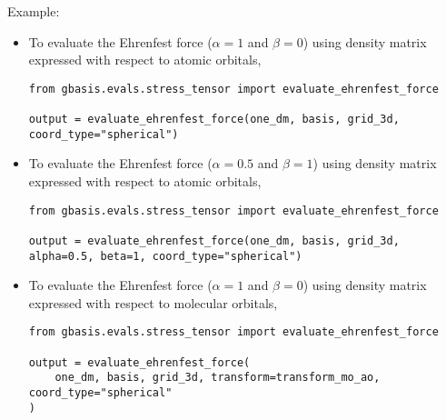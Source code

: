 \documentclass[letterpaper]{article}
\begin{document}
Example:
\begin{itemize}
\item To evaluate the Ehrenfest force ($\alpha=1$ and $\beta=0$)
  using density matrix expressed with respect to atomic orbitals,
  \begin{lstlisting}[xleftmargin=-25pt]
from gbasis.evals.stress_tensor import evaluate_ehrenfest_force

output = evaluate_ehrenfest_force(one_dm, basis, grid_3d, coord_type="spherical")
\end{lstlisting}
\item To evaluate the Ehrenfest force ($\alpha=0.5$ and $\beta=1$)
  using density matrix expressed with respect to atomic orbitals,
  \begin{lstlisting}[xleftmargin=-25pt]
from gbasis.evals.stress_tensor import evaluate_ehrenfest_force

output = evaluate_ehrenfest_force(one_dm, basis, grid_3d, alpha=0.5, beta=1, coord_type="spherical")
\end{lstlisting}
\item To evaluate the Ehrenfest force ($\alpha=1$ and $\beta=0$)
  using density matrix expressed with respect to molecular orbitals,
  \begin{lstlisting}[xleftmargin=-25pt]
from gbasis.evals.stress_tensor import evaluate_ehrenfest_force

output = evaluate_ehrenfest_force(
    one_dm, basis, grid_3d, transform=transform_mo_ao, coord_type="spherical"
)
\end{lstlisting}
\end{itemize}
\end{document}
